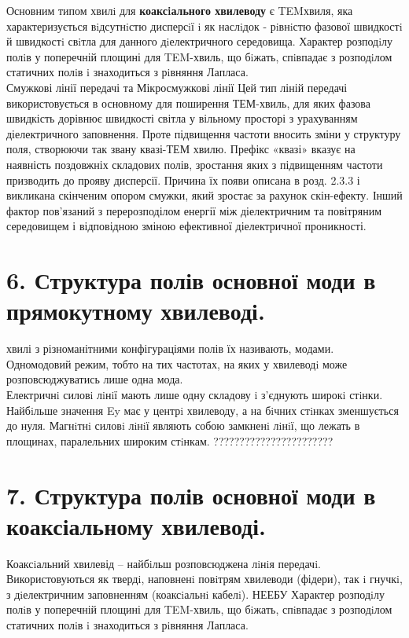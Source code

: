 \documentclass[a4paper,14pt]{extreport}
\begin{document}
Основним типом хвилi для \textbf{коаксiального хвилеводу} є TEMхвиля, яка характеризується вiдсутнiстю дисперсiї i як наслiдок -
рiвнiстю фазової швидкостi й швидкостi свiтла для данного
дiелектричного середовища. Характер розподiлу полiв у поперечній
площині для TEM-хвиль, що бiжать, спiвпадає з розподiлом
статичних полiв i знаходиться з рiвняння Лапласа.\\

Смужкові лінії передачі та Мікросмужкові лінії Цей тип ліній передачі використовується в основному для
поширення ТЕМ-хвиль, для яких фазова швидкість дорівнює
швидкості світла у вільному просторі з урахуванням діелектричного
заповнення. Проте підвищення частоти вносить зміни у структуру
поля, створюючи так звану квазі-ТЕМ хвилю. Префікс «квазі»
вказує на наявність поздовжніх складових полів, зростання яких з
підвищенням частоти призводить до прояву дисперсії. Причина їх
появи описана в розд. 2.3.3 і викликана скінченим опором смужки,
який зростає за рахунок скін-ефекту. Інший фактор пов'язаний з
перерозподілом енергії між діелектричним та повітряним
середовищем і відповідною зміною ефективної діелектричної
проникності.


\section{6. Структура полів основної моди в прямокутному хвилеводі.}
хвилі з різноманітними конфігураціями
полів їх називають, модами.\\
Одномодовий режим, тобто на тих частотах, на яких у хвилеводi
може розповсюджуватись лише одна мода.\\
Електричнi силовi лiнiї мають лише
одну складову i з'єднують широкi стiнки. Найбiльше значення Ey
має у центрi хвилеводу, а на бiчних стiнках зменшується до нуля.
Магнiтнi силовi лiнiї являють собою замкненi лiнiї, що лежать в
площинах, паралельних широким стiнкам. ???????????????????????

\section{7. Структура полів основної моди в коаксіальному хвилеводі.}
Коаксiальний хвилевід – найбiльш розповсюджена
лiнiя передачi. Використовуються як твердi, наповненi
повiтрям хвилеводи (фідери), так i гнучкi, з дiелектричним
заповненням (коаксiальнi кабелi).
НЕЕБУ Характер розподiлу полiв у поперечній
площині для TEM-хвиль, що бiжать, спiвпадає з розподiлом
статичних полiв i знаходиться з рiвняння Лапласа.
\end{document}
